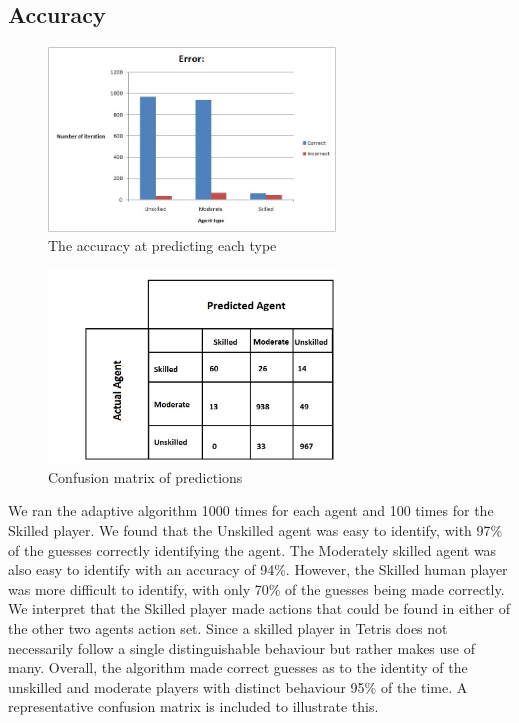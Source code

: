 \documentclass[11pt, conference, compsoc]{IEEEtran}
\let\MYoriglatexcaption\caption
\renewcommand{\caption}[2][\relax]{\MYoriglatexcaption[#2]{#2}}
\begin{document}
\subsection*{Accuracy}
\FloatBarrier
\begin{figure}[!h]
	\centering
	\includegraphics[width=3in]{accuracy.jpg}
	\caption{The accuracy at predicting each type}
	\label{Figure 3}
\end{figure}
\FloatBarrier
\FloatBarrier
\begin{figure}[!h]
	\centering
	\includegraphics[width=3in]{confuse.jpg}
	\caption{Confusion matrix of predictions}
	\label{Figure 2}
\end{figure}
\FloatBarrier
We ran the adaptive algorithm 1000 times for each agent and 100 times for the Skilled player. We found that the Unskilled agent was easy to identify, with 97\% of the guesses correctly identifying the agent. The Moderately skilled agent was also easy to identify with an accuracy of 94\%. However, the Skilled human player was more difficult to identify, with only 70\% of the guesses being made correctly. We interpret that the Skilled player made actions that could be found in either of the other two agents action set. Since a skilled player in Tetris does not necessarily follow a single distinguishable behaviour but rather makes use of many.
Overall, the algorithm made correct guesses as to the identity of the unskilled and moderate players with distinct behaviour 95\% of the time. A representative confusion matrix is included to illustrate this.
\end{document}
